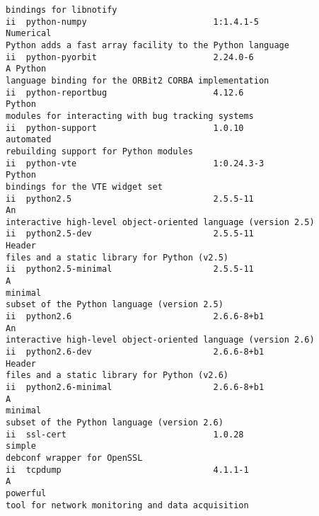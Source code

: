 \documentclass[a4paper,12pt]{report}
\newenvironment{myscriptlisting}
{\begin{list}{}{\setlength{\leftmargin}{1em}}\item\scriptsize\bfseries}
{\end{list}}
\begin{document}
\begin{myscriptlisting}
\begin{verbatim}
bindings for libnotify
ii  python-numpy                         1:1.4.1-5                     
Numerical
Python adds a fast array facility to the Python language
ii  python-pyorbit                       2.24.0-6                       A Python
language binding for the ORBit2 CORBA implementation
ii  python-reportbug                     4.12.6                         Python
modules for interacting with bug tracking systems
ii  python-support                       1.0.10                        
automated
rebuilding support for Python modules
ii  python-vte                           1:0.24.3-3                     Python
bindings for the VTE widget set
ii  python2.5                            2.5.5-11                       An
interactive high-level object-oriented language (version 2.5)
ii  python2.5-dev                        2.5.5-11                       Header
files and a static library for Python (v2.5)
ii  python2.5-minimal                    2.5.5-11                       A
minimal
subset of the Python language (version 2.5)
ii  python2.6                            2.6.6-8+b1                     An
interactive high-level object-oriented language (version 2.6)
ii  python2.6-dev                        2.6.6-8+b1                     Header
files and a static library for Python (v2.6)
ii  python2.6-minimal                    2.6.6-8+b1                     A
minimal
subset of the Python language (version 2.6)
ii  ssl-cert                             1.0.28                         simple
debconf wrapper for OpenSSL
ii  tcpdump                              4.1.1-1                        A
powerful
tool for network monitoring and data acquisition
 \end{verbatim}
\end{myscriptlisting}
\end{document}
